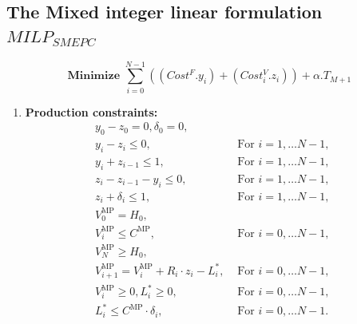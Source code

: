 \documentclass[11pt]{article}
\theoremstyle{plain}%
\theoremstyle{definition} \newtheorem{lem}{Lemma}[section]
\theoremstyle{definition} \newtheorem{claim}{Claim}[lem]
\theoremstyle{definition} \newtheorem{theorem}{Theorem}[section]
\theoremstyle{definition} \newtheorem{exo}{Exercice n$^\circ$}
\theoremstyle{definition} \newtheorem{quest}{}[exo]
\theoremstyle{definition} \newtheorem{sousquest}{}[quest]
\theoremstyle{remark}
\theoremstyle{definition}
\begin{document}
\subsection{The Mixed integer linear formulation $MILP_{SMEPC}$}
\begin{equation}
				\textbf{ Minimize }\sum_{i=0}^{N-1}((Cost^F. y_i) + (Cost_i^V . z_i))+ \alpha .T_{M+1}	\label{Fonction_obj}
	\end{equation}
	\begin{enumerate}
	\item {\bf Production constraints:}
	\begin{eqnarray}	
	y_0-z_0=0, \delta_0 = 0, &&\label{Prod0}\\
	y_i - z_i \leq 0, & \textrm{ For   } i = 1, \ldots N - 1 ,& \label{Prod1}\\
 y_i + z_{i - 1} \leq 1, & \textrm{ For   } i = 1, \ldots N - 1 , &\label{Prod2}\\
z_i - z_{i - 1}-y_i \leq 0, & \textrm{ For   } i = 1, \ldots N - 1 ,& \label{Prod3}\\
z_i+\delta_i \leq 1, &\textrm{ For }  i= 1, \ldots N-1,&\label{Prod4}\\ 
	V^{\textrm{MP}}_{0}= H_0, & & \label{Prod5} \\
		V^{\textrm{MP}}_{i}\leq C^{\textrm{MP}},  &\textrm{ For  } i = 0, \ldots N-1, &	\label{Prod7}	\\
			V_{N}^{\textrm{MP}}\geq H_{0},&& \label{Prod6}\\
		V^{\textrm{MP}}_{i+1}= V^{\textrm{MP}}_{i}+ R_i \cdot z_i -  L^*_i,  &\textrm{ For }  i = 0, \ldots N-1, &	\label{Prod8}	\\
			 V^{\textrm{MP}}_{i} \geq 0, L^*_i \geq 0, & \textrm{ For }  i = 0, \ldots N-1, &\label{Prod9}\\
			 L^*_i \leq  C^{\textrm{MP}} \cdot \delta_i, & \textrm{ For }  i = 0, \ldots N-1.& \label{Prod10}
\end{eqnarray}


\end{enumerate}
\end{document}
